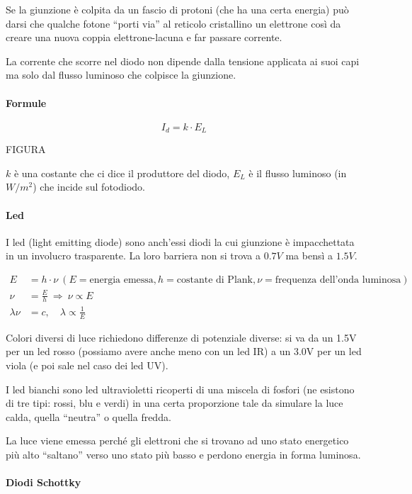 \documentclass[
]{article}
\begin{document}
Se la giunzione è colpita da un fascio di protoni (che ha una certa
energia) può darsi che qualche fotone ``porti via'' al reticolo
cristallino un elettrone così da creare una nuova coppia
elettrone-lacuna e far passare corrente.

La corrente che scorre nel diodo non dipende dalla tensione applicata ai
suoi capi ma solo dal flusso luminoso che colpisce la giunzione.

\paragraph{Formule}\label{formule-1}

\[
I_d = k \cdot E_{L}
\]

FIGURA

\(k\) è una costante che ci dice il produttore del diodo, \(E_L\) è il
flusso luminoso (in \(W /m^2\)) che incide sul fotodiodo.

\paragraph{Led}\label{led}

I led (light emitting diode) sono anch'essi diodi la cui giunzione è
impacchettata in un involucro trasparente. La loro barriera non si trova
a \(0.7V\) ma bensì a \textbf{\(1.5V\)}.

\begin{align*}
E&=h\cdot\nu\ (E = \text{energia emessa}, h = \text{costante di Plank}, \nu = \text{frequenza
dell'onda luminosa})\\
\nu&=\frac{E}{h}\ \Longrightarrow\ \nu\propto E \\
\lambda\nu&=c, \quad \lambda\propto\frac{1}{E}
\end{align*}

Colori diversi di luce richiedono differenze di potenziale diverse: si
va da un 1.5V per un led rosso (possiamo avere anche meno con un led IR)
a un 3.0V per un led viola (e poi sale nel caso dei led UV).

I led bianchi sono led ultravioletti ricoperti di una miscela di fosfori
(ne esistono di tre tipi: rossi, blu e verdi) in una certa proporzione
tale da simulare la luce calda, quella ``neutra'' o quella fredda.

La luce viene emessa perché gli elettroni che si trovano ad uno stato
energetico più alto ``saltano'' verso uno stato più basso e perdono
energia in forma luminosa.

\paragraph{Diodi Schottky}\label{diodi-schottky}
\end{document}
